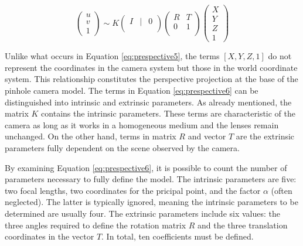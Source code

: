 \begin{equation} 
  \label{eq:prespective6}
  \begin{pmatrix}
  u \\ 
  v \\ 
  1
  \end{pmatrix}
  \sim
  K
  \begin{pmatrix}
    I & | & 0 \\ 
    \end{pmatrix}
  \begin{pmatrix}
    R & T \\ 
    0 & 1 \\ 
    \end{pmatrix}
  \begin{pmatrix}
  X \\ 
  Y \\ 
  Z \\ 
  1
  \end{pmatrix}
\end{equation}

Unlike what occurs in Equation \ref{eq:prespective5}, the terms $[X, Y, Z, 1]$ do not represent the coordinates in the camera system but those in the world coordinate system. This relationship constitutes the perspective projection at the base of the pinhole camera model. 
The terms in Equation \ref{eq:prespective6} can be distinguished into intrinsic and extrinsic parameters. As already mentioned, the matrix $K$ contains the intrinsic parameters. These terms are characteristic of the camera as long as it works in a homogeneous medium and the lenses remain unchanged.
On the other hand, terms in matrix $R$ and vector $T$ are the extrinsic parameters fully dependent on the scene observed by the camera.

By examining Equation \ref{eq:prespective6}, it is possible to count the number of parameters necessary to fully define the model.
The intrinsic parameters are five: two focal lengths, two coordinates for the pricipal point, and the factor $\alpha$ (often neglected). The latter is typically ignored, meaning the intrinsic parameters to be determined are usually four. The extrinsic parameters include six values: the three angles required to define the rotation matrix $R$ and the three translation coordinates in the vector $T$. In total, ten coefficients must be defined.

